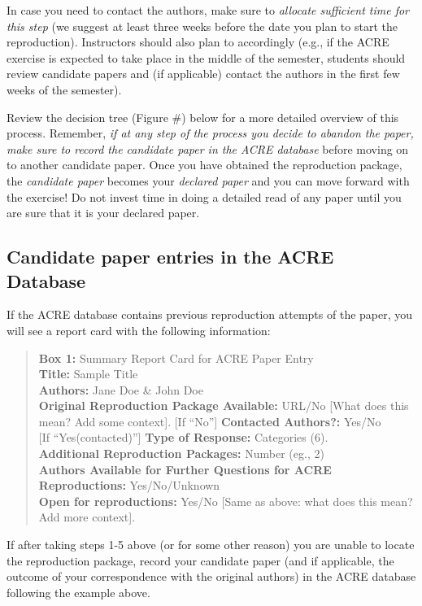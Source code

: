 \documentclass[]{book}
\begin{document}
In case you need to contact the authors, make sure to \emph{allocate sufficient time for this step} (we suggest at least three weeks before the date you plan to start the reproduction). Instructors should also plan to accordingly (e.g., if the ACRE exercise is expected to take place in the middle of the semester, students should review candidate papers and (if applicable) contact the authors in the first few weeks of the semester).

Review the decision tree (Figure \#) below for a more detailed overview of this process. Remember, \emph{if at any step of the process you decide to abandon the paper, make sure to record the candidate paper in the ACRE database} before moving on to another candidate paper. Once you have obtained the reproduction package, the \emph{candidate paper} becomes your \emph{declared paper} and you can move forward with the exercise! Do not invest time in doing a detailed read of any paper until you are sure that it is your declared paper.

\hypertarget{check-acre}{%
\subsection{Candidate paper entries in the ACRE Database}\label{check-acre}}

If the ACRE database contains previous reproduction attempts of the paper, you will see a report card with the following information:

\begin{quote}
\textbf{Box 1:} Summary Report Card for ACRE Paper Entry\\
\textbf{Title:} Sample Title\\
\textbf{Authors:} Jane Doe \& John Doe\\
\textbf{Original Reproduction Package Available:} URL/No {[}What does this mean? Add some context{]}.
{[}If ``No''{]} \textbf{Contacted Authors?:} Yes/No\\
{[}If ``Yes(contacted)''{]} \textbf{Type of Response:} Categories (6).\\
\textbf{Additional Reproduction Packages:} Number (eg., 2)\\
\textbf{Authors Available for Further Questions for ACRE Reproductions:} Yes/No/Unknown\\
\textbf{Open for reproductions:} Yes/No {[}Same as above: what does this mean? Add more context{]}.
\end{quote}

If after taking steps 1-5 above (or for some other reason) you are unable to locate the reproduction package, record your candidate paper (and if applicable, the outcome of your correspondence with the original authors) in the ACRE database following the example above.
\end{document}
